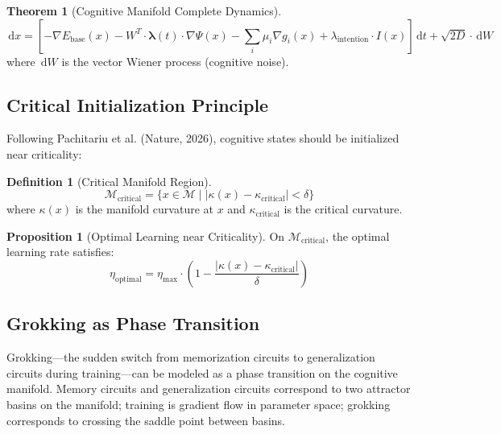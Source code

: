 \documentclass[11pt,a4paper]{article}
\theoremstyle{definition}
\newtheorem{definition}{Definition}[section]
\newtheorem{theorem}{Theorem}[section]
\newtheorem{proposition}{Proposition}[section]
\theoremstyle{remark}
\newcommand{\lambdavec}{\boldsymbol{\lambda}}
\newcommand{\M}{\mathcal{M}}
\newcommand{\diff}{\,\mathrm{d}}
\begin{document}
\begin{theorem}[Cognitive Manifold Complete Dynamics]\label{thm:manifold-dynamics}
\begin{equation}
\diff x = \left[-\nabla E_{\text{base}}(x) - W^T \cdot \lambdavec(t) \cdot \nabla \Psi(x) - \sum_i \mu_i \nabla g_i(x) + \lambda_{\text{intention}} \cdot I(x)\right]\diff t + \sqrt{2D} \cdot \diff W
\end{equation}
where $\diff W$ is the vector Wiener process (cognitive noise).
\end{theorem}

\subsection{Critical Initialization Principle}\label{subsec:critical-manifold}

Following Pachitariu et al. (Nature, 2026), cognitive states should be initialized near criticality:

\begin{definition}[Critical Manifold Region]\label{def:critical-region}
\begin{equation}
\M_{\text{critical}} = \{x \in \M \mid |\kappa(x) - \kappa_{\text{critical}}| < \delta\}
\end{equation}
where $\kappa(x)$ is the manifold curvature at $x$ and $\kappa_{\text{critical}}$ is the critical curvature.
\end{definition}

\begin{proposition}[Optimal Learning near Criticality]\label{prop:optimal-learning}
On $\M_{\text{critical}}$, the optimal learning rate satisfies:
\begin{equation}
\eta_{\text{optimal}} = \eta_{\text{max}} \cdot \left(1 - \frac{|\kappa(x) - \kappa_{\text{critical}}|}{\delta}\right)
\end{equation}
\end{proposition}

\subsection{Grokking as Phase Transition}\label{subsec:grokking}

Grokking---the sudden switch from memorization circuits to generalization circuits during training---can be modeled as a phase transition on the cognitive manifold. Memory circuits and generalization circuits correspond to two attractor basins on the manifold; training is gradient flow in parameter space; grokking corresponds to crossing the saddle point between basins.
\end{document}
